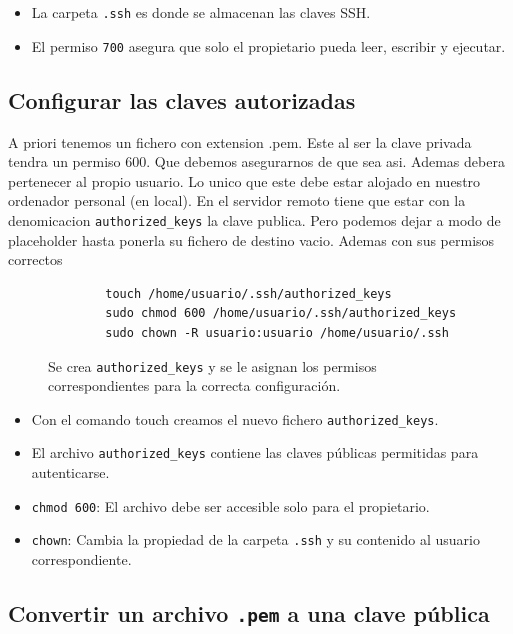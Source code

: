 \begin{itemize}
    \item La carpeta \texttt{.ssh} es donde se almacenan las claves SSH.
    \item El permiso \texttt{700} asegura que solo el propietario pueda leer, escribir y ejecutar.
\end{itemize}

\subsection{Configurar las claves autorizadas}

A priori tenemos un fichero con extension .pem. Este al ser la clave privada tendra un permiso 600. Que debemos asegurarnos de que sea asi.
Ademas debera pertenecer al propio usuario. Lo unico que este debe estar alojado en nuestro ordenador personal (en local). En el servidor remoto
tiene que estar con la denomicacion \texttt{authorized\_keys} la clave publica. Pero podemos dejar a modo de placeholder hasta ponerla su fichero de destino vacio.
Ademas con sus permisos correctos

\begin{figure}[h!]
    \centering
    \begin{verbatim}
        touch /home/usuario/.ssh/authorized_keys
        sudo chmod 600 /home/usuario/.ssh/authorized_keys
        sudo chown -R usuario:usuario /home/usuario/.ssh
    \end{verbatim}
    \caption{Se crea \texttt{authorized\_keys} y se le asignan los permisos correspondientes para la correcta configuración.}
    \label{fig:creamos_authorized_keys}
\end{figure}

\begin{itemize}
    \item Con el comando touch creamos el nuevo fichero \texttt{authorized\_keys}.
    \item El archivo \texttt{authorized\_keys} contiene las claves públicas permitidas para autenticarse.
    \item \texttt{chmod 600}: El archivo debe ser accesible solo para el propietario.
    \item \texttt{chown}: Cambia la propiedad de la carpeta \texttt{.ssh} y su contenido al usuario correspondiente.
\end{itemize}


\subsection{Convertir un archivo \texttt{.pem} a una clave pública}

